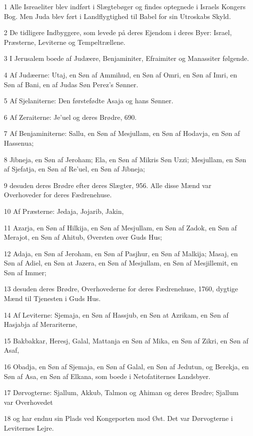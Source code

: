 \par 1 Alle Isreaeliter blev indført i Slægtebøger og findes optegnede i Israels Kongers Bog. Men Juda blev ført i Landflygtighed til Babel for sin Utroskabs Skyld.
\par 2 De tidligere Indbyggere, som levede på deres Ejendom i deres Byer: Israel, Præsterne, Leviterne og Tempeltrællene.
\par 3 I Jerusalem boede af Judæere, Benjaminiter, Efraimiter og Manassiter følgende.
\par 4 Af Judæerne: Utaj, en Søn af Ammihud, en Søn af Omri, en Søn af Imri, en Søn af Bani, en af Judas Søn Perez's Sønner.
\par 5 Af Sjelaniterne: Den førstefødte Asaja og hans Sønner.
\par 6 Af Zeraiterne: Je'uel og deres Brødre, 690.
\par 7 Af Benjaminiterne: Sallu, en Søn af Mesjullam, en Søn af Hodavja, en Søn af Hassenua;
\par 8 Jibneja, en Søn af Jeroham; Ela, en Søn af Mikris Søn Uzzi; Mesjullam, en Søn af Sjefatja, en Søn af Re'uel, en Søn af Jibneja;
\par 9 desuden deres Brødre efter deres Slægter, 956. Alle disse Mænd var Overhoveder for deres Fædrenehuse.
\par 10 Af Præsterne: Jedaja, Jojarib, Jakin,
\par 11 Azarja, en Søn af Hilkija, en Søn af Mesjullam, en Søn af Zadok, en Søn af Merajot, en Søn af Ahitub, Øversten over Guds Hus;
\par 12 Adaja, en Søn af Jeroham, en Søn af Pasjhur, en Søn af Malkija; Masaj, en Søn af Adiel, en Søn at Jazera, en Søn af Mesjullam, en Søn af Mesjillemit, en Søn af Immer;
\par 13 desuden deres Brødre, Overhovederne for deres Fædrenehuse, 1760, dygtige Mænd til Tjenesten i Guds Hus.
\par 14 Af Leviterne: Sjemaja, en Søn af Hassjub, en Søn at Azrikam, en Søn af Hasjabja af Merariterne,
\par 15 Bakbakkar, Heresj, Galal, Mattanja en Søn af Mika, en Søn af Zikri, en Søn af Asaf,
\par 16 Obadja, en Søn af Sjemaja, en Søn af Galal, en Søn af Jedutun, og Berekja, en Søn af Asa, en Søn af Elkana, som boede i Netofatiternes Landsbyer.
\par 17 Dørvogterne: Sjallum, Akkub, Talmon og Ahiman og deres Brødre; Sjallum var Overhovedet
\par 18 og har endnu sin Plads ved Kongeporten mod Øst. Det var Dørvogterne i Leviternes Lejre.
